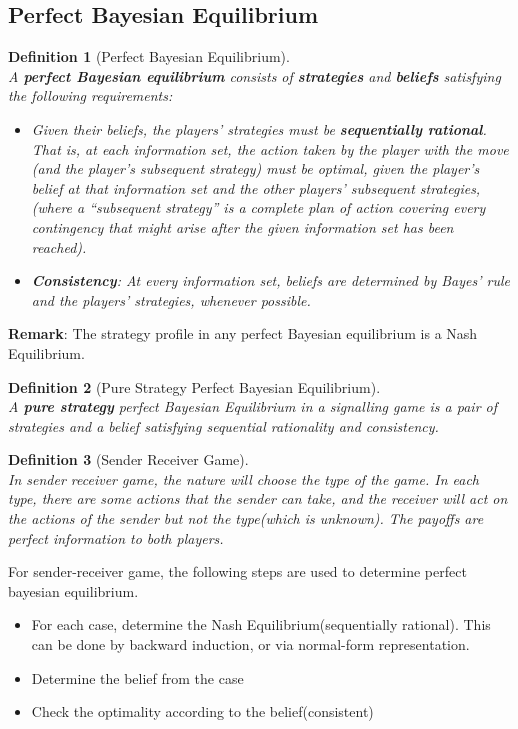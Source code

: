\documentclass[12pt]{article}
\newtheorem{definition}{Definition}[section]
\theoremstyle{definition}
\begin{document}
\subsection{Perfect Bayesian Equilibrium}
\begin{definition}[Perfect Bayesian Equilibrium]
\hfill\\\normalfont A \textbf{perfect Bayesian equilibrium} consists of \textbf{strategies} \textit{and} \textbf{beliefs} satisfying the following requirements:
\begin{itemize}
  \item Given their beliefs, the players' strategies must be \textbf{sequentially rational}. \\That is, at each information set, the action taken by the player with the move (and the player's subsequent strategy) must be optimal, given the player's belief at that information set and the other players' subsequent strategies, (where a ``subsequent strategy'' is a complete plan of action covering every contingency that might arise after the given information set has been reached).
  \item \textbf{Consistency}: At every information set, beliefs are determined by Bayes' rule and the players' strategies, whenever possible.
\end{itemize}
\end{definition}
\textbf{Remark}: The strategy profile in any perfect Bayesian equilibrium is a Nash Equilibrium.
\begin{definition}[Pure Strategy Perfect Bayesian Equilibrium]
\hfill\\\normalfont A \textbf{pure strategy} perfect Bayesian Equilibrium in a signalling game is a pair of strategies and a belief satisfying sequential rationality and consistency.
\end{definition}
\begin{definition}[Sender Receiver Game]
\hfill\\\normalfont In sender receiver game, the nature will choose the type of the game. In each type, there are some actions that the sender can take, and the receiver will act on the actions of the sender but not the type(which is unknown). The payoffs are perfect information to both players.
\end{definition}
For sender-receiver game, the following steps are used to determine perfect bayesian equilibrium.
\begin{itemize}
  \item For each case, determine the Nash Equilibrium(sequentially rational). This can be done by backward induction, or via normal-form representation.
  \item Determine the belief from the case
  \item Check the optimality according to the belief(consistent)
\end{itemize}
\end{document}
